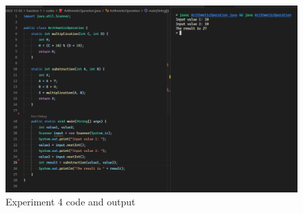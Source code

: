\documentclass[12pt,titlepage]{article}
\begin{document}
\begin{enumerate}
{        \begin{figure}[h]
            \centering
            \includegraphics[width=.75\textwidth]{./images/arithmetic-operation.png}
            \caption{Experiment 4 code and output}
        \end{figure}
    }
\end{enumerate}
\end{document}
